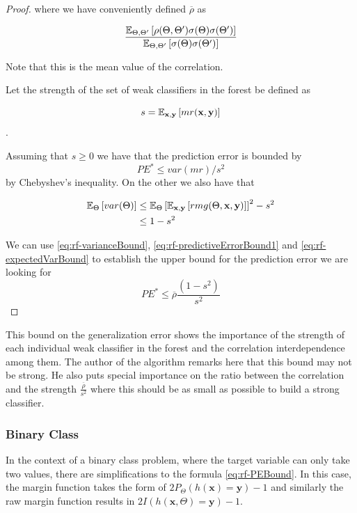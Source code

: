 \begin{proof}
	where we have conveniently defined $\overline{\rho}$ as
	
	\[\label{eq:rf-meanCorrelation}
	\frac{\operatorname{\mathbb{E}}_{\Theta, \Theta'} \left[ \rho(\Theta, \Theta') \sigma(\Theta) \sigma(\Theta')\right]}
	{\operatorname{\mathbb{E}}_{\Theta, \Theta'} \left[ \sigma(\Theta) \sigma(\Theta')\right]}
	\]
	
	Note that this is the mean value of the correlation.
	
	Let the strength of the set of weak classifiers in the forest be defined as
	
	\[
	s = \operatorname{\mathbb{E}}_{\textbf{x},\textbf{y}} \left[ mr(\textbf{x},\textbf{y} ) \right] 
	\].\label{eq:rf-strength}
	
	Assuming that $s \geq 0$ we have that the prediction error is bounded by
	\[\label{eq:rf-predictiveErrorBound1}
	PE^* \leq var(mr)/s^2
	\]
	by Chebyshev's inequality. On the other we also have that
	
	
	\[\label{eq:rf-expectedVarBound}
	\begin{split}
	\operatorname{\mathbb{E}}_{\Theta} \left[ var(\Theta) \right] & \leq \operatorname{\mathbb{E}}_{\Theta} \left[ \operatorname{\mathbb{E}}_{\textbf{x},\textbf{y}}\left[ rmg(\Theta,\textbf{x},\textbf{y})  \right] \right]^2 -s^2 \\
	& \leq 1-s^2
	\end{split}
	\]
	
	
	We can use \cref{eq:rf-varianceBound}, \cref{eq:rf-predictiveErrorBound1} and \cref{eq:rf-expectedVarBound} to establish the upper bound for the prediction error we are looking for
	\[\label{eq:rf-PEBound}
	PE^* \leq \overline{\rho}\frac{(1-s^2)}{s^2}
	\]
\end{proof}


This bound on the generalization error shows the importance of the strength of each individual weak classifier in the forest and the correlation interdependence among them. The author of the algorithm \cite{breiman-randomforests} remarks here that this bound may not be strong. He also puts special importance on the ratio between the correlation and the strength $\frac{\overline{\rho}}{s^2}$ where this should be as small as possible to build a strong classifier.


\subsubsection{Binary Class}
In the context of a binary class problem, where the target variable can only take two values, there are simplifications to the formula \cref{eq:rf-PEBound}. In this case, the margin function takes the form of $2 P_{\Theta}(h(\textbf{x}) = \textbf{y}) -1$ and similarly the raw margin function results in $2 I(h(\textbf{x}, \Theta) = \textbf{y}) -1$.


